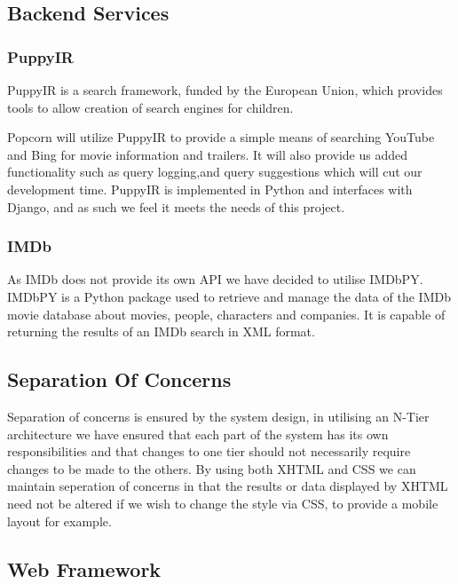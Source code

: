 \documentclass{sig-alt-release2}
\begin{document}
\subsection{Backend Services}
 
 
\subsubsection*{PuppyIR }
 
PuppyIR is a search framework, funded by the European Union, which provides tools to allow creation of search engines for children. \cite{puppyir}
 
Popcorn will utilize PuppyIR to provide a simple means of searching YouTube and Bing for movie information and trailers. It will also provide us added functionality such as query logging,and query suggestions which will cut our development time. PuppyIR is implemented in Python \cite{python} and interfaces with Django, and as such we feel it meets the needs of this project. 
 
\subsubsection*{IMDb}
 
As IMDb does not provide its own API we have decided to utilise IMDbPY.  IMDbPY is a Python package used to retrieve and manage the data of the IMDb movie database about movies, people, characters and companies. \cite{imdbpy}
It is capable of returning the results of an IMDb search in XML format. 
 
 
\subsection{Separation Of Concerns}
 
Separation of concerns is ensured by the system design, in utilising an N-Tier architecture we have ensured that each part of the system has its own responsibilities and that changes to one tier should not necessarily require changes to be made to the others. By using both XHTML and CSS we can maintain seperation of concerns in that the results or data displayed by XHTML need not be altered if we wish to change the style via CSS, to provide a mobile layout for example. 
 
\subsection{Web Framework} 
 
\end{document}
